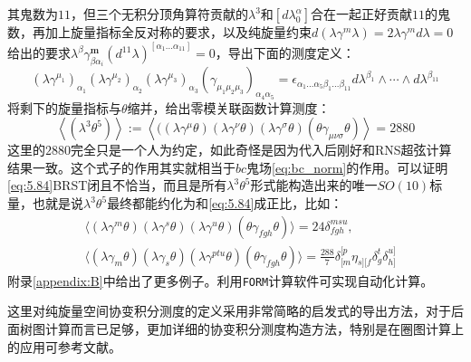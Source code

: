 其鬼数为$11$，但三个无积分顶角算符贡献的$\lambda^3$和$[d\lambda_0^\alpha]$合在一起正好贡献$11$的鬼数，再加上旋量指标全反对称的要求，以及纯旋量约束$d(\lambda\gamma^{m}\lambda)=2\lambda\gamma^{m}d\lambda=0$给出的要求$\lambda^\beta\gamma_{\beta\alpha_i}^{\boldsymbol{m}}(d^{11}\lambda)^{[\alpha_1...\alpha_{11}]}=0$，导出下面的测度定义：
\begin{equation}
	[d\lambda^\alpha](\lambda\gamma^{\mu_1})_{\alpha_1}(\lambda\gamma^{\mu_2})_{\alpha_2}(\lambda\gamma^{\mu_3})_{\alpha_3}(\gamma_{\mu_1\mu_2\mu_3})_{\alpha_4\alpha_5}=\epsilon_{\alpha_1...\alpha_5\beta_1...\beta_{11}}d\lambda^{\beta_1}\wedge\cdots\wedge d\lambda^{\beta_{11}}
\end{equation}
将剩下的旋量指标与$\theta$缩并，给出零模关联函数计算测度：
\begin{equation}
	\label{eq:5.84}
	\boxed{
	\left\langle(\lambda^3\theta^5)\right\rangle:=\left\langle((\lambda\gamma^\mu\theta)(\lambda\gamma^\nu\theta)(\lambda\gamma^\sigma\theta)(\theta\gamma_{\mu\nu\sigma}\theta)\right\rangle = 2880
	}
\end{equation}
这里的$2880$完全只是一个人为约定，如此奇怪是因为代入后刚好和RNS超弦计算结果一致。这个式子的作用其实就相当于$bc$鬼场\ref{eq:bc_norm}的作用。可以证明\ref{eq:5.84}BRST闭且不恰当，而且是所有$\lambda^3\theta^5$形式能构造出来的唯一$SO(10)$标量，也就是说$\lambda^3\theta^5$最终都能约化为和\ref{eq:5.84}成正比，比如：
\begin{equation}
	\label{eq:5.85}
	\begin{aligned}
		&\langle(\lambda\gamma^m\theta)(\lambda\gamma^s\theta)(\lambda\gamma^u\theta)(\theta\gamma_{fgh}\theta)\rangle=24\delta_{fgh}^{msu},\\&\langle(\lambda\gamma_m\theta)(\lambda\gamma_s\theta)(\lambda\gamma^{ptu}\theta)(\theta\gamma_{fgh}\theta)\rangle=\frac{288}{7}\delta_{[m}^{[p}\eta_{s][f}\delta_g^t\delta_{h]}^{u]}
	\end{aligned}
\end{equation}
附录\ref{appendix:B}中给出了更多例子。利用\texttt{FORM}计算软件可实现自动化计算。\cite{Mafra:2010pn}

这里对纯旋量空间协变积分测度的定义采用非常简略的启发式的导出方法，对于后面树图计算而言已足够，更加详细的协变积分测度构造方法，特别是在圈图计算上的应用可参考文献\cite{gzq,Berkovits:2004px,GomezZuniga:2011soo,Gomez:2009qd,Berkovits:2004bw}。

